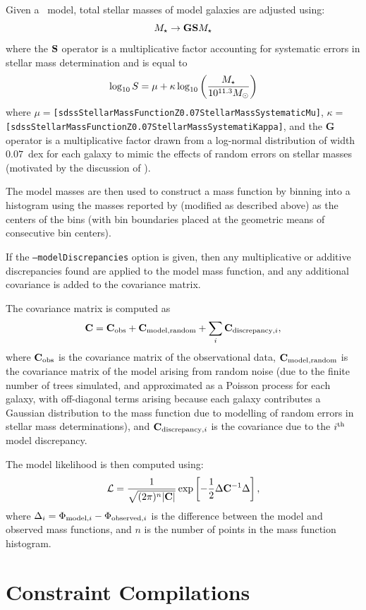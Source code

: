 Given a \glc\ model, total stellar masses of model galaxies are adjusted using:
\begin{equation}
 M_\star \rightarrow {\bf G} {\bf S} M_\star 
\end{equation}
where the ${\bf S}$ operator is a multiplicative factor accounting for systematic errors in stellar mass determination and is equal to \citep{behroozi_comprehensive_2010}
\begin{equation}
 \log_{\rm 10} S = \mu + \kappa \log_{\rm 10} \left({M_\star \over 10^{11.3}M_\odot}\right)
\end{equation}
where $\mu=${\tt [sdssStellarMassFunctionZ0.07StellarMassSystematicMu]}, $\kappa=${\tt [sdssStellarMassFunctionZ0.07StellarMassSystematiKappa]}, and the {\bf G} operator is a multiplicative factor drawn from a log-normal distribution of width $0.07$~dex for each galaxy to mimic the effects of random errors on stellar masses (motivated by the discussion of \cite{behroozi_comprehensive_2010}).

The model masses are then used to construct a mass function by binning into a histogram using the masses reported by \cite{li_distribution_2009} (modified as described above) as the centers of the bins (with bin boundaries placed at the geometric means of consecutive bin centers).

If the {\tt --modelDiscrepancies} option is given, then any multiplicative or additive discrepancies found are applied to the model mass function, and any additional covariance is added to the covariance matrix.

The covariance matrix is computed as
\begin{equation}
 {\bf C} = {\bf C}_{\rm obs} + {\bf C}_{\rm model,random} + \sum_i {\bf C}_{{\rm discrepancy}, i},
\end{equation}
where ${\bf C}_{\rm obs}$ is the covariance matrix of the observational data, ${\bf C}_{\rm model,random}$ is the covariance matrix of the model arising from random noise (due to the finite number of trees simulated, and approximated as a Poisson process for each galaxy, with off-diagonal terms arising because each galaxy contributes a Gaussian distribution to the mass function due to modelling of random errors in stellar mass determinations), and ${\bf C}_{{\rm discrepancy}, i}$ is the covariance due to the $i^{\rm th}$ model discrepancy.

The model likelihood is then computed using:
\begin{equation}
 \mathcal{L} = {1 \over \sqrt{(2 \pi)^n |{\bf C}|}} \exp\left[ -{1\over 2} \Delta {\bf C}^{-1} \Delta \right],
\end{equation}
where $\Delta_i = \Phi_{{\rm model}, i} - \Phi_{{\rm observed}, i}$ is the difference between the model and observed mass functions, and $n$ is the number of points in the mass function histogram.

\section{Constraint Compilations}
